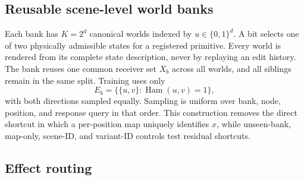 \documentclass{article}
\begin{document}
\subsection{Reusable scene-level world banks}

Each bank has $K=2^d$ canonical worlds indexed by $u\in\{0,1\}^d$.  A bit
selects one of two physically admissible states for a registered primitive.
Every world is rendered from its complete state description, never by replaying
an edit history.  The bank reuses one common receiver set $X_b$ across all
worlds, and all siblings remain in the same split.  Training uses only
\begin{equation}
    E_b=\{\{u,v\}:\operatorname{Ham}(u,v)=1\},
\end{equation}
with both directions sampled equally.  Sampling is uniform over bank, node,
position, and response query in that order.  This construction removes the
direct shortcut in which a per-position map uniquely identifies $x$, while
unseen-bank, map-only, scene-ID, and variant-ID controls test residual shortcuts.

\subsection{Effect routing}
\end{document}
